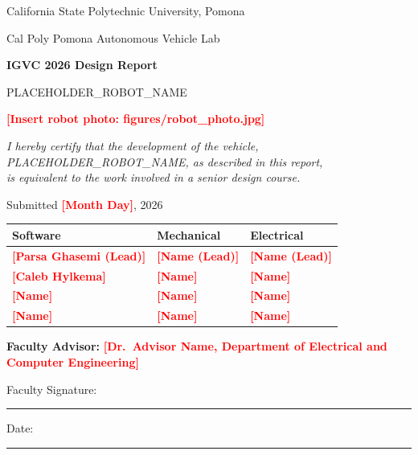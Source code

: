 \documentclass[11pt, letterpaper]{article}
\newcommand{\placeholder}[1]{\textcolor{red}{\textbf{[#1]}}}
\newcommand{\robotname}{PLACEHOLDER\_ROBOT\_NAME}
\newcommand{\teamname}{Cal Poly Pomona Autonomous Vehicle Lab}
\newcommand{\university}{California State Polytechnic University, Pomona}
\begin{document}
\begin{titlepage}
    \centering
    \vspace*{0.8cm}

    {\Large \university \par}
    \vspace{0.25cm}
    {\Large \teamname \par}
    \vspace{0.25cm}
    {\LARGE\bfseries IGVC 2026 Design Report \par}
    \vspace{0.25cm}
    {\Large \robotname \par}

    \vspace{0.7cm}
    \placeholder{Insert robot photo: figures/robot\_photo.jpg}

    \vspace{0.5cm}

    \textit{I hereby certify that the development of the vehicle, \robotname{}, as described in this report,\\
    is equivalent to the work involved in a senior design course.}

    \vspace{0.25cm}
    Submitted \placeholder{Month Day}, 2026

    \vspace{0.8cm}

    \begin{tabular}{l l l}
        \toprule
        \textbf{Software} & \textbf{Mechanical} & \textbf{Electrical} \\
        \midrule
        \placeholder{Parsa Ghasemi (Lead)} & \placeholder{Name (Lead)} & \placeholder{Name (Lead)} \\
        \placeholder{Caleb Hylkema} & \placeholder{Name} & \placeholder{Name} \\
        \placeholder{Name} & \placeholder{Name} & \placeholder{Name} \\
        \placeholder{Name} & \placeholder{Name} & \placeholder{Name} \\
        \bottomrule
    \end{tabular}

    \vspace{0.8cm}

    \textbf{Faculty Advisor:} \placeholder{Dr.~Advisor Name, Department of Electrical and Computer Engineering}

    \vspace{0.25cm}
    Faculty Signature: \rule{6cm}{0.4pt} \quad Date: \rule{2cm}{0.4pt}

\end{titlepage}
\end{document}
